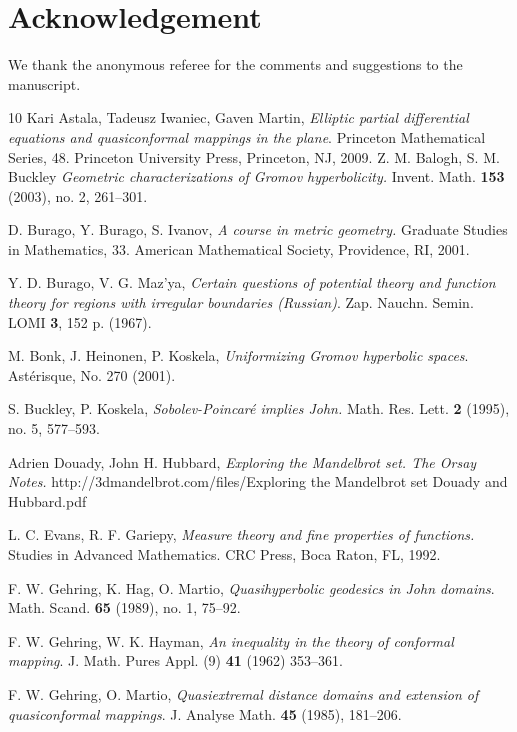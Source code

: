 \documentclass[reqno,11pt]{amsart}
\numberwithin{equation}{section}
\theoremstyle{remark}
\begin{document}
\section*{Acknowledgement}
We thank the anonymous referee for the comments and suggestions to
the manuscript.

\begin{thebibliography}{10}
%
Kari Astala, Tadeusz Iwaniec, Gaven Martin,  \emph{Elliptic partial differential equations and quasiconformal mappings in the plane}. Princeton Mathematical Series, 48. Princeton University Press, Princeton, NJ, 2009. 
Z. M. Balogh, S. M. Buckley \emph{Geometric characterizations of Gromov hyperbolicity. } 
Invent. Math.  \textbf{153} (2003), no. 2, 261--301.

D.  Burago, Y. Burago, S.  Ivanov, 
\emph{A course in metric geometry.} 
Graduate Studies in Mathematics, 33. American Mathematical Society, Providence, RI, 2001.

Y. D. Burago, V. G. Maz'ya, \emph{Certain questions of potential theory and
function theory for regions with irregular boundaries (Russian)}. Zap. Nauchn.
Semin. LOMI \textbf{3}, 152 p. (1967). 

M. Bonk, J. Heinonen, P. Koskela, \emph{Uniformizing Gromov hyperbolic spaces}. Ast\'erisque, No. 270 (2001).

S. Buckley, P.  Koskela, 
\emph{Sobolev-Poincar\'e implies John.} 
Math. Res. Lett. \textbf{2} (1995), no. 5, 577--593. 




 Adrien Douady, John H. Hubbard, 
\emph{Exploring the Mandelbrot set. The Orsay Notes.}
http://3dmandelbrot.com/files/Exploring the Mandelbrot set Douady and Hubbard.pdf

L. C. Evans, R. F. Gariepy,  \emph{Measure theory and fine properties of functions.} Studies in Advanced Mathematics. CRC Press, Boca Raton, FL, 1992. 

F. W. Gehring, K.  Hag, O.  Martio, 
\emph{Quasihyperbolic geodesics in John domains}. 
Math. Scand.  \textbf{65} (1989), no. 1, 75--92. 

F. W. Gehring, W. K. Hayman, \emph{An inequality in the theory of conformal mapping}. 
J. Math. Pures Appl. (9) \textbf{41} (1962) 353--361. 

 F. W. Gehring, O. Martio, \emph{Quasiextremal distance domains and extension of quasiconformal mappings}. 
J. Analyse Math. \textbf{45} (1985), 181--206. 


\end{thebibliography}
\end{document}
